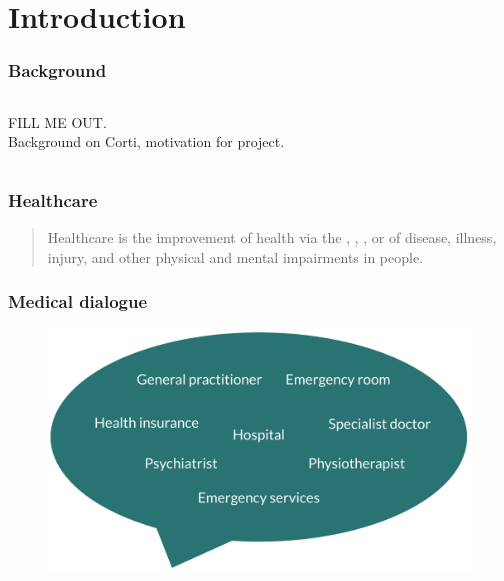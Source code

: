 
\section{Introduction}

\begin{frame}
    \frametitle{Background}
    \begin{columns}
        \begin{column}{0.6\textwidth}
            FILL ME OUT. \\
            Background on Corti, motivation for project.
        \end{column}
        \begin{column}{0.4\textwidth}
        \end{column}
    \end{columns}
\end{frame}


\begin{frame}
    \frametitle{Healthcare}
    \begin{quotation}
        \noindent\centering
        Healthcare is the improvement of health via the , , ,  or  of {\color{theme-green}disease}, {\color{theme-green}illness}, {\color{theme-green}injury}, and {\color{theme-green}other physical and mental impairments} in people.
    \end{quotation}
\end{frame}


\begin{frame}
    \frametitle{Medical dialogue}
    \begin{figure}
        \centering
        \includegraphics[width=0.7\paperwidth]{figures/speech_bubble.pdf}
    \end{figure}

\end{frame}


